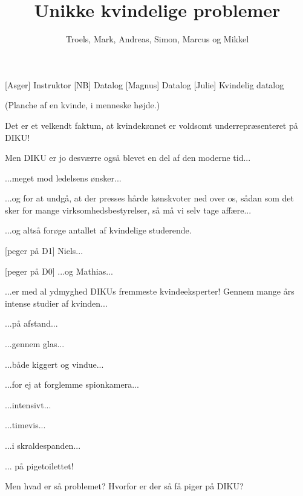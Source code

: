 \documentclass[a4paper,11pt]{article}
\title{Unikke kvindelige problemer}
\author{Troels, Mark, Andreas, Simon, Marcus og Mikkel}
\begin{document}
\maketitle

\begin{roles}
    [Asger] Instruktor
    [NB] Datalog
    [Magnus] Datalog
    [Julie] Kvindelig datalog
\end{roles}

\begin{props}
(Planche af en kvinde, i menneske højde.)
\end{props}

\begin{sketch}
   Det er et velkendt faktum, at kvindekønnet er voldsomt
  underrepræsenteret på DIKU!

   Men DIKU er jo desværre også blevet en del af den moderne
  tid...

   ...meget mod ledelsens ønsker...

   ...og for at undgå, at der presses hårde kønskvoter ned
  over os, sådan som det sker for mange virksomhedsbestyrelser, så må
  vi selv tage affære...

   ...og altså forøge antallet af kvindelige studerende.

  [peger på D1] Niels...

  [peger på D0] ...og Mathias...


   ...er med al ydmyghed DIKUs fremmeste kvindeeksperter!
  Gennem mange års intense studier af kvinden...

   ...på afstand...

   ...gennem glas...

   ...både kiggert og vindue...

   ...for ej at forglemme spionkamera...

   ...intensivt...

   ...timevis...

   ...i skraldespanden...

   ... på pigetoilettet!


   Men hvad er så problemet?  Hvorfor er der så få piger på
  DIKU?


\end{sketch}
\end{document}

